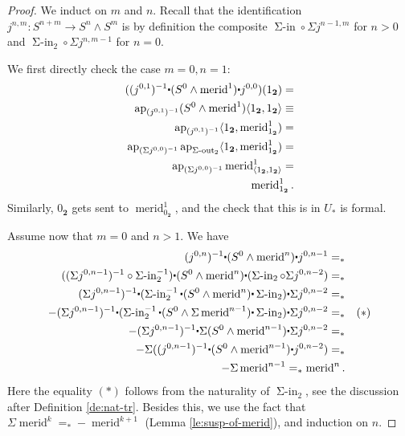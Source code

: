 \documentclass{amsart}
\theoremstyle{definition}
\newcommand{\ap}{\operatorname{ap}}
\newcommand{\merid}{\operatorname{merid}}
\newcommand{\siin}{\operatorname{\Sigma-in}}
\newcommand{\sout}{\operatorname{\Sigma-out}}
\newcommand{\s}{\mathbf{2}}
\newcommand{\whisk}{\raisebox{0.5ex}{$\displaystyle\centerdot$}}
\begin{document}
\begin{proof}
    We induct on $m$ and $n$. Recall that the identification $j^{n,m}: S^{n+m} \to S^n \wedge S^m$ is by definition the composite $\siin \circ \Sigma j^{n-1,m}$ for $n>0$ and $\siin_2 \circ \Sigma j^{n,m-1}$ for $n=0$.

    We first directly check the case $m=0, n=1$:
    \begin{align*}
    (({j^{0,1}})^{-1} \whisk (S^0 \wedge \merid^1) \whisk j^{0,0})(1_{\s}) = \\
    \ap_{({j^{0,1}})^{-1}}(S^0 \wedge \merid^1)\langle 1_{\s}, 1_{\s} \rangle \equiv  \\
    \ap_{({j^{0,1}})^{-1}} \langle 1_{\s}, \merid^1_{1_{\s}}) = \\
    \ap_{(\Sigma {j^{0,0}})^{-1}} \ap_{\sout_2} \langle 1_{\s}, \merid^1_{1_{\s}} ) = \\
    \ap_{(\Sigma {j^{0,0}})^{-1}} \merid^1_{\langle 1_{\s},1_{\s} \rangle}
    = \\
    \merid^1_{1_{\s}}.
    \end{align*}
    Similarly, $0_{\s}$ gets sent to $\merid^1_{0_{\s}}$, and the check that this is in $U_*$ is formal.

    Assume now that $m=0$ and $n>1$. We have
    \begin{align*}
        ({j^{0,n}})^{-1} \whisk (S^0 \wedge \merid^n) \whisk j^{0,n-1} =_* \\
        ((\Sigma {j^{0,n-1}})^{-1} \circ \siin_2^{-1}) \whisk (S^0 \wedge \merid^n) \whisk (\siin_2 \circ \Sigma j^{0,n-2}) =_* \\
        (\Sigma {j^{0,n-1}})^{-1} \whisk (\siin_2^{-1} \whisk (S^0 \wedge \merid^n) \whisk \siin_2) \whisk \Sigma j^{0,n-2} =_* \\
        -(\Sigma {j^{0,n-1}})^{-1} \whisk (\siin_2^{-1} \whisk (S^0 \wedge \Sigma \merid^{n-1}) \whisk \siin_2) \whisk \Sigma j^{0,n-2} =_* && (*) \\
        -(\Sigma {j^{0,n-1}})^{-1} \whisk \Sigma (S^0 \wedge \merid^{n-1}) \whisk \Sigma j^{0,n-2} =_* \\
        -\Sigma (({j^{0,n-1}})^{-1} \whisk (S^0 \wedge \merid^{n-1}) \whisk j^{0,n-2}) =_* \\
        -\Sigma \merid^{n-1} =_* \merid^n.
    \end{align*}
    Here the equality $(*)$ follows from the naturality of $\siin_2$, see the discussion after Definition \ref{de:nat-tr}. Besides this, we use the fact that $\Sigma \merid^k =_* -\merid^{k+1}$ (Lemma \ref{le:susp-of-merid}), and induction on $n$.


\end{proof}
\end{document}
